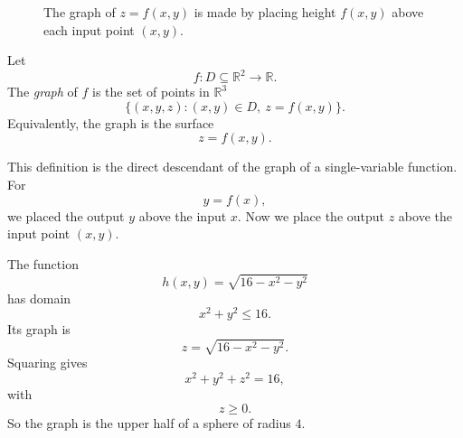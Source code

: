 \begin{figure}[h]
\centering
{}
\caption{The graph of \(z=f(x,y)\) is made by placing height \(f(x,y)\) above each
input point \((x,y)\).}
\end{figure}

\begin{definition}
Let
\[
    f:D\subseteq\mathbb R^2\to\mathbb R.
\]
The \emph{graph} of \(f\) is the set of points in \(\mathbb R^3\)
\[
\boxed{
    \{(x,y,z): (x,y)\in D,\ z=f(x,y)\}.
}
\]
Equivalently, the graph is the surface
\[
    z=f(x,y).
\]
\end{definition}

This definition is the direct descendant of the graph of a single-variable function.
For
\[
    y=f(x),
\]
we placed the output \(y\) above the input \(x\).  Now we place the output \(z\) above
the input point \((x,y)\).

\begin{example}
The function
\[
    h(x,y)=\sqrt{16-x^2-y^2}
\]
has domain
\[
    x^2+y^2\le 16.
\]
Its graph is
\[
    z=\sqrt{16-x^2-y^2}.
\]
Squaring gives
\[
    x^2+y^2+z^2=16,
\]
with
\[
    z\ge0.
\]
So the graph is the upper half of a sphere of radius \(4\).
\end{example}

